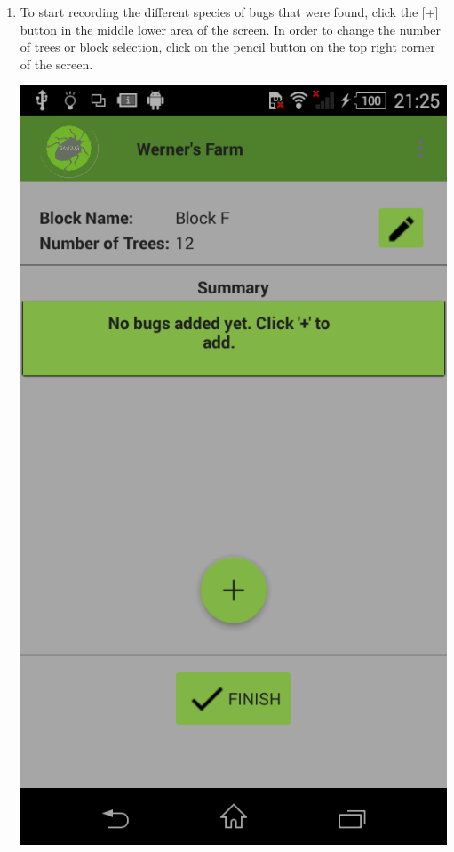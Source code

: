\documentclass[11pt,a4paper,titlepage]{article}
\begin{document}
\begin{enumerate}
 \item To start recording the different species of bugs that were found, click the [+] button in the middle lower area of the screen. In order to change the number of trees or block selection, click on the pencil button on the top right corner of the screen.
		\begin{center}
				\includegraphics[scale=0.3]{enterdataempty}
			\end{center}


\end{enumerate}
\end{document}
